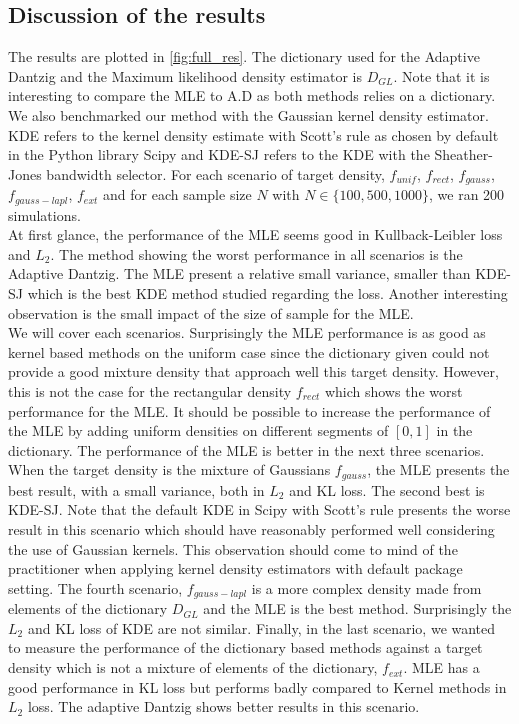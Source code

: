 \subsection{Discussion of the results}
The results are plotted in \cref{fig:full_res}. The dictionary used for the Adaptive Dantzig and the Maximum likelihood density estimator is $D_{GL}$. Note that it is interesting to compare the MLE to A.D as both methods relies on a dictionary. We also benchmarked our method with the Gaussian kernel density estimator. KDE refers to the kernel density estimate with Scott's rule as chosen by default in the Python library Scipy and KDE-SJ refers to the KDE with the Sheather-Jones bandwidth selector. For each scenario of target density, $f_{unif}$, $f_{rect}$, $f_{gauss}$, $f_{gauss-lapl}$, $f_{ext}$ and for each sample size $N$  with $N\in\{100, 500, 1000\}$, we ran 200 simulations. \\
At first glance, the performance of the MLE seems good in Kullback-Leibler loss and $L_2$. The method showing the worst performance in all scenarios is the Adaptive Dantzig. The MLE present a relative small variance, smaller than KDE-SJ which is the best KDE method studied regarding the loss. Another interesting observation is the small impact of the size of sample for the MLE.\\
We will cover each scenarios. Surprisingly the MLE performance is as good as kernel based methods on the uniform case since the dictionary given could not provide a good mixture density that approach well this target density. However, this is not the case for the rectangular density $f_{rect}$ which shows the worst performance for the MLE. It should be possible to increase the performance of the MLE by adding uniform densities on different segments of $[0,1]$ in the dictionary. The performance of the MLE is better in the next three scenarios. When the target density is the mixture of Gaussians $f_{gauss}$, the MLE presents the best result, with a small variance, both in $L_2$ and KL loss. The second best is KDE-SJ. Note that the default KDE in Scipy with Scott's rule presents the worse result in this scenario which should have reasonably performed well considering the use of Gaussian kernels. This observation should come to mind of the practitioner when applying kernel density estimators with default package setting. The fourth scenario, $f_{gauss-lapl}$ is a more complex density made from elements of the dictionary $D_{GL}$ and the MLE is the best method. Surprisingly the $L_2$ and KL loss of KDE are not similar. Finally, in the last scenario, we wanted to measure the performance of the dictionary based methods against a target density which is not a mixture of elements of the dictionary, $f_{ext}$. MLE has a good performance in KL loss but performs badly compared to Kernel methods in $L_2$ loss. The adaptive Dantzig shows better results in this scenario.\\

